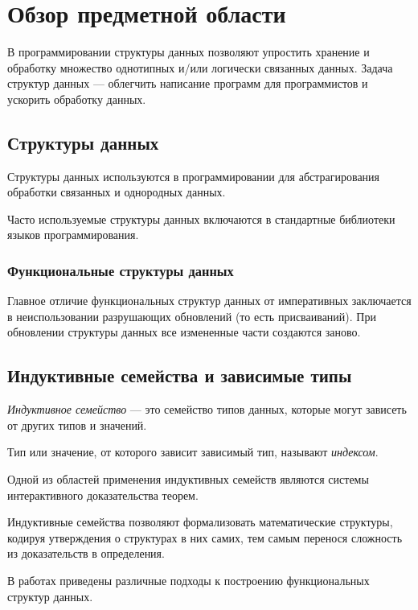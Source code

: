 \chapter{Обзор предметной области}
\label{chapter1}

В программировании структуры данных позволяют упростить хранение и обработку
множество однотипных и/или логически связанных данных.
Задача структур данных — облегчить написание программ для программистов и
ускорить обработку данных.

\section{Структуры данных}
Структуры данных используются в программировании для абстрагирования
обработки связанных и однородных данных.

Часто используемые структуры данных включаются в стандартные библиотеки
языков программирования.

\subsection{Функциональные структуры данных}

Главное отличие функциональных структур данных от императивных \cite{OkasakiBook}
заключается в неиспользовании разрушающих обновлений (то есть присваиваний).
При обновлении структуры данных все измененные части создаются заново.

\section{Индуктивные семейства и зависимые типы}

\begin{definition}
\emph{Индуктивное семейство} \cite{DybjerIndFam}— это семейство типов данных,
которые могут зависеть от других типов и значений.

Тип или значение, от которого зависит зависимый тип, называют \emph{индексом}.
\end{definition}

Одной из областей применения индуктивных семейств являются системы интерактивного
доказательства теорем.

Индуктивные семейства позволяют формализовать математические структуры,
кодируя утверждения о структурах в них самих, тем самым перенося сложность из
доказательств в определения.

В работах \cite{OkasakiThesis, McBridePivotal} приведены различные подходы
к построению функциональных структур данных.

